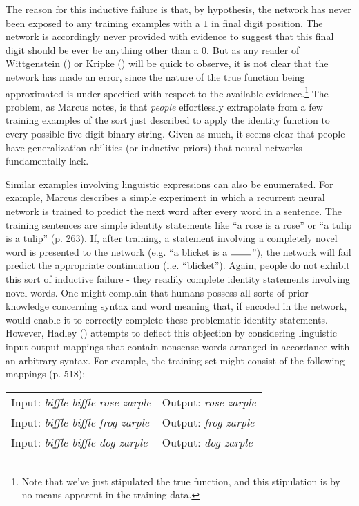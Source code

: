 The reason for this inductive failure is that, by hypothesis, the network has never been exposed to any training examples with a $1$ in final digit position. The network is accordingly never provided with evidence to suggest that this final digit should be ever be anything other than a $0$. But as any reader of Wittgenstein (\citeyear{Wittgenstein:1953}) or Kripke (\citeyear{Kripke:1982}) will be quick to observe, it is not clear that the network has made an error, since the nature of the true function being approximated is under-specified with respect to the available evidence.\footnote{Note that we've just stipulated the true function, and this stipulation is by no means apparent in the training data.} The problem, as Marcus notes, is that \textit{people} effortlessly extrapolate from a few training examples of the sort just described to apply the identity function to every possible five digit binary string. Given as much, it seems clear that people have generalization abilities (or inductive priors) that neural networks fundamentally lack.

Similar examples involving linguistic expressions can also be enumerated. For example, Marcus describes a simple experiment in which a recurrent neural network is trained to predict the next word after every word in a sentence. The training sentences are simple identity statements like ``a rose is a rose'' or ``a tulip is a tulip'' (p. 263). If, after training, a statement involving a completely novel word is presented to the network (e.g. ``a blicket is a $\rule{0.75cm}{0.15mm}$''), the network will fail predict the appropriate continuation (i.e. ``blicket''). Again, people do not exhibit this sort of inductive failure - they readily complete identity statements involving novel words. One might complain that humans possess all sorts of prior knowledge concerning syntax and word meaning that, if encoded in the network, would enable it to correctly complete these problematic identity statements. However, Hadley (\citeyear{Hadley:2009}) attempts to deflect this objection by considering linguistic input-output mappings that contain nonsense words arranged in accordance with an arbitrary syntax. For example, the training set might consist of the following mappings (p. 518):

\vskip 0.12in
\begin{tabular}{l l} 
Input: \textit{biffle biffle rose zarple}  & Output: \textit{rose zarple} \\
Input: \textit{biffle biffle frog zarple } & Output: \textit{frog zarple} \\
Input: \textit{biffle biffle dog zarple} & Output: \textit{dog zarple} \\
\end{tabular} 
\vskip 0.12in

